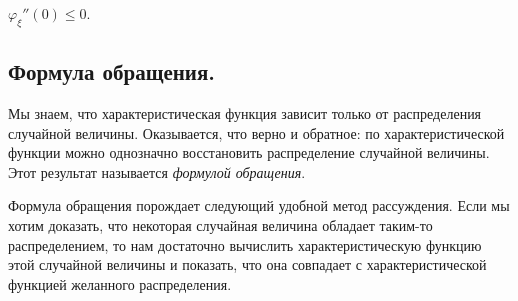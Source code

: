 \documentclass[../main.tex]{subfiles}
\begin{document}
\begin{crly}
 $ \varphi_\xi''(0) \leqslant 0 $.
\end{crly}

\subsection{Формула обращения.}

Мы знаем, что характеристическая функция зависит только от распределения случайной величины. Оказывается, что верно и обратное: по характеристической функции можно однозначно восстановить распределение случайной величины. Этот результат называется \textit{формулой обращения}.

Формула обращения порождает следующий удобной метод рассуждения. Если мы хотим доказать, что некоторая случайная величина обладает таким-то распределением, то нам достаточно вычислить характеристическую функцию этой случайной величины и показать, что она совпадает с характеристической функцией желанного распределения.
\end{document}
